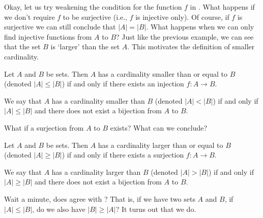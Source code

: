 Okay, let us try weakening the condition for the function $f$ in . What happens if we don't require $f$ to be surjective (i.e., $f$ is injective only). Of course, if $f$ is surjective we can still conclude that $|A| = |B|$. What happens when we can only find injective functions from $A$ to $B$? Just like the previous example, we can see that the set $B$ is `larger' than the set $A$. This motivates the definition of smaller cardinality.

\begin{definition}\label{definition:smaller-or-equal-cardinality}
    Let $A$ and $B$ be sets. Then $A$ has a cardinality smaller than or equal to $B$ (denoted $|A| \leq |B|$) if and only if there exists an injection $f: A \to B$.
    
    We say that $A$ has a cardinality smaller than $B$ (denoted $|A| < |B|$) if and only if $|A| \leq |B|$ and there does not exist a bijection from $A$ to $B$.
\end{definition}

What if a surjection from $A$ to $B$ exists? What can we conclude?

\begin{definition}\label{definition:larger-or-equal-cardinality}
    Let $A$ and $B$ be sets. Then $A$ has a cardinality larger than or equal to $B$ (denoted $|A| \geq |B|$) if and only if there exists a surjection $f: A \to B$.
    
    We say that $A$ has a cardinality larger than $B$ (denoted $|A| > |B|$) if and only if $|A| \geq |B|$ and there does not exist a bijection from $A$ to $B$.
\end{definition}

Wait a minute, does  agree with ? That is, if we have two sets $A$ and $B$, if $|A| \leq |B|$, do we also have $|B| \geq |A|$? It turns out that we do.

